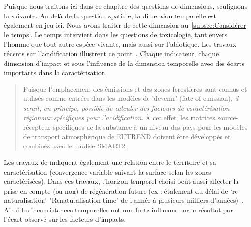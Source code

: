 Puisque nous traitons ici dans ce chapitre des questions de dimensions, soulignons la suivante.
Au delà de la question spatiale, la dimension temporelle est également en jeu ici.
Nous avons traiter de cette dimension au~\ref{subsec:Considérer le temps}.
Le temps intervient dans les questions de toxicologie, tant envers l'homme que tout autre espèce vivante, mais aussi sur l'abiotique.
Les travaux récents sur l'acidification illustrent ce point~\cite{van_zelm_time_2007}.
Chaque indicateur, chaque dimension d'impact et sous l'influence de la dimension temporelle avec des écarts importants dans la caractérisation.
\blockcquote[traduction]{van_zelm_time_2007}{
Puisque l'emplacement des émissions et des zones forestières sont connus et utilisés comme entrées dans les modèles de 'devenir' (fate of emission), \emph{il serait, en principe, possible de calculer des facteurs de caractérisation régionaux spécifiques pour l'acidification}.
À cet effet, les matrices source-récepteur spécifiques de la substance à un niveau des pays pour les modèles de transport atmosphérique de EUTREND doivent être développés et combinés avec le modèle SMART2.
}
\keybox{
Toutefois, ce que nous retenons de ce type de travaux n'est pas uniquement la possibilité de calculer des facteurs régionaux spécifiques.
\textbf{Ce que nous retenons surtout, c'est la possibilité d'observer directement les modèles qui apparaissent dans ces publications (CARMEN, EUTREND, SMART2)}.
Tous ces travaux inaccessibles ou non publiés sont à la base des éléments objectifs pour la rationalisation des décisions.
Et parce qu'ils sont fondamentaux dans la constitution des indicateurs pour la décision, ils doivent être librement accessibles, vérifiables, reproductibles et exploitables.
}

Les travaux de \citeauthor{schmidt_development_2008} indiquent également une relation entre le territoire et sa caractérisation (convergence variable suivant la surface selon les zones caractérisées).
Dans ces travaux, l'horizon temporel choisi peut aussi affecter la prise en compte (ou non) de régénération future (ex : étalement du délai de `re naturalisation' "Renaturalisation time" de l'année à plusieurs milliers d'années)~\cite{schmidt_development_2008}.
Ainsi les inconsistances temporelles ont une forte influence sur le résultat par l'écart observé sur les facteurs d'impacts.

